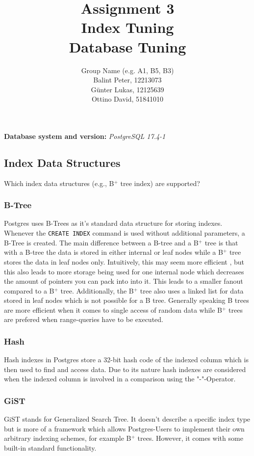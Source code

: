 \documentclass[11pt]{scrartcl}
\title{
  \textbf{\large Assignment 3} \\
  Index Tuning \\
  {\large Database Tuning}}
\author{
  Group Name (e.g. A1, B5, B3) \\
  \large Balint Peter, 12213073 \\
  \large Günter Lukas, 12125639 \\
  \large Ottino David, 51841010
}
\begin{document}
\maketitle

\textbf{Database system and version:} \emph{PostgreSQL 17.4-1}

\subsection{Index Data Structures}

Which index data structures (e.g., B$^+$ tree index) are supported?

\subsubsection{B-Tree}
Postgres uses B-Trees as it's standard data structure for storing indexes. Whenever the \texttt{CREATE INDEX} command is used without additional parameters, a B-Tree is created. The main difference between a B-tree and a B$^+$ tree is that with a B-tree the data is stored in either internal or leaf nodes while a B$^+$ tree stores the data in leaf nodes only. Intuitively, this may seem more efficient , but  this also leads to more storage being used for one internal node which decreases the amount of pointers you can pack into into it. This leads to a smaller fanout compared to a B$^+$ tree. Additionally,  the B$^+$ tree also uses a linked list for data stored in leaf nodes which is not possible for a B tree. Generally speaking B trees are more efficient when it comes to single access of random data while B$^+$ trees are prefered when range-queries have to be executed.

\subsubsection{Hash}
Hash indexes in Postgres store a 32-bit hash code of the indexed column which is then used to find and access data. Due to its nature hash indexes are considered when the indexed column is involved in a comparison using the "-"-Operator.

\subsubsection{GiST}
GiST stands for Generalized Search Tree. It doesn't describe a specific index type but is more of a framework which allows Postgres-Users to implement their own arbitrary indexing schemes, for example B$^+$ trees. However, it comes with some built-in standard functionality.
\end{document}
